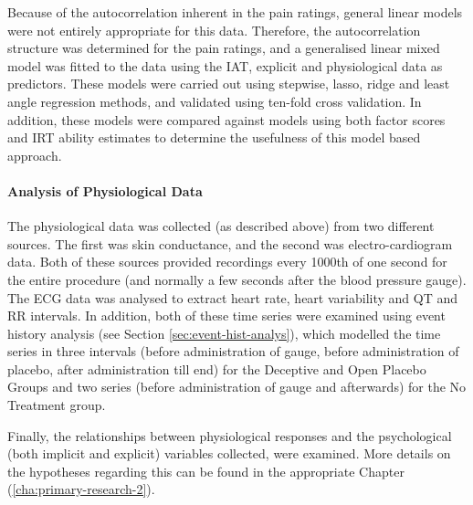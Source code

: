 Because of the autocorrelation inherent in the pain ratings, general linear models were not entirely appropriate for this data. Therefore, the autocorrelation structure was determined for the pain ratings, and a generalised linear mixed model was fitted to the data using the IAT, explicit and physiological data as predictors. These models were carried out using stepwise, lasso, ridge and least angle regression methods, and validated using ten-fold cross validation. In addition, these models were compared against models using both factor scores and IRT ability estimates to determine the usefulness of this model based approach. 

\paragraph{Analysis of Physiological Data}
\label{sec:analys-phys-data}

The physiological data was collected (as described above) from  two different sources. The first was skin conductance, and the second was electro-cardiogram data. Both of these sources provided recordings every 1000th of one second for the entire procedure (and normally a few seconds after the blood pressure gauge). The ECG data was analysed to extract heart rate, heart variability  and QT and RR intervals. In addition, both of these time series were examined using event history analysis (see Section \ref{sec:event-hist-analys}), which modelled the time series in three intervals (before administration of gauge, before administration of placebo, after administration till end) for the Deceptive and Open Placebo Groups and two series (before administration of gauge and afterwards) for the No Treatment group.

Finally, the relationships between physiological responses and the psychological (both implicit and explicit) variables collected, were examined. More details on the hypotheses regarding this can be found in the appropriate Chapter (\ref{cha:primary-research-2}).





